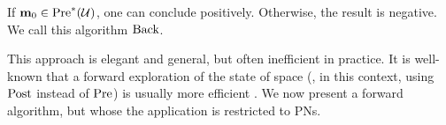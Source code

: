 If $\mathbf{m}_0 \in \operatorname{Pre}^*_{}(\mathcal{U})$, one can conclude positively.
Otherwise, the result is negative.
We call this algorithm $\operatorname{Back}$.

This approach is elegant and general, but often inefficient in practice.
It is well-known that a forward exploration of the state of space (, in this context, using $\operatorname{Post}$ instead of $\operatorname{Pre}$) is usually more efficient \citep{Henzinger98}.
We now present a forward algorithm, but whose the application is restricted to \acp{PN}.
